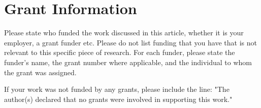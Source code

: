 \section*{Grant Information}
Please state who funded the work discussed in this article, whether it is your employer, a grant funder etc. Please do not list funding that you have that is not relevant to this specific piece of research. For each funder, please state the funder’s name, the grant number where applicable, and the individual to whom the grant was assigned.

If your work was not funded by any grants, please include the line: "The author(s) declared that no grants were involved in supporting this work."

